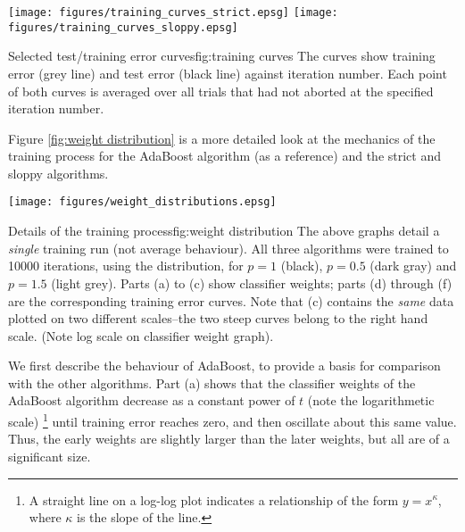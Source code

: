 \begin{linefigure}
\begin{center}
\texttt{[image: figures/training\_curves\_strict.epsg]}
\texttt{[image: figures/training\_curves\_sloppy.epsg]}
\end{center}
\begin{capt}{Selected test/training error curves}{fig:training curves}
The curves show training error (grey line) and test error (black
line) against iteration number.  Each point of both curves is
averaged over all trials that had not aborted at the specified
iteration number.
\end{capt}
\end{linefigure}

Figure \ref{fig:weight distribution} is a more detailed look at the
mechanics of the training process for the AdaBoost algorithm (as a
reference) and the strict and sloppy algorithms.

\begin{linefigure}
\begin{center}
\hspace*{-1cm}\texttt{[image: figures/weight\_distributions.epsg]}
\end{center}
\begin{capt}{Details of the training process}{fig:weight distribution}
The above graphs detail a \emph{single} training run (not average
behaviour).  All three algorithms were trained to 10000 iterations,
using the  distribution, for $p=1$ (black), $p=0.5$
(dark gray) and $p=1.5$ (light grey).  Parts (a) to (c) show
classifier weights; parts (d) through (f) are the corresponding
training error curves.  Note that (c) contains the \emph{same} data
plotted on two different scales--the two steep curves belong to the
right hand scale.  (Note log scale on classifier weight graph).
\end{capt}
\end{linefigure}

We first describe the behaviour of AdaBoost, to provide a basis for
comparison with the other algorithms.  Part (a) shows that the
classifier weights of the AdaBoost algorithm decrease as a constant
power of $t$ (note the logarithmetic scale)%
\footnote{A straight line on a log-log plot indicates a relationship
of the form $y = x^{\kappa}$, where $\kappa$ is the slope of the line.}
until training error reaches zero, and then oscillate about this same
value.  Thus, the early weights are slightly larger than the later
weights, but all are of a significant size.

